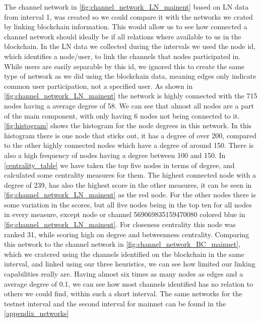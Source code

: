 The channel network in \cref{fig:channel_network_LN_mainent} based on LN data from interval 1, was created so we could compare it with the networks we crated by linking blockchain information. This would allow us to see how connected a channel network should ideally be if all relations where available to us in the blockchain. In the LN data we collected during the intervals we used the node id, which identifies a node/user, to link the channels that nodes participated in. While users are easily separable by this id, we ignored this to create the same type of network as we did using the blockchain data, meaning edges only indicate common user participation, not a specified user. 
As shown in \cref{fig:channel_network_LN_mainent} the network is highly connected with the 715 nodes having a average degree of 58. We can see that almost all nodes are a part of the main component, with only having 6 nodes not being connected to it.
\cref{fig:histogram} shows the histogram for the node degrees in this network. In this histogram there is one node that sticks out, it has a degree of over 200, compared to the other highly connected nodes which have a degree of around 150. There is also a high frequency of nodes having a degree between 100 and 150. In \cref{centrality_table} we have taken the top five nodes in terms of degree, and calculated some centrality measures for them. The highest connected node with a degree of 239, has also the highest score in the other measures, it can be seen in \cref{fig:channel_network_LN_mainent} as the red node. For the other nodes there is some variation in the scores, but all five nodes being in the top ten for all nodes in every measure, except node or channel 569069835159470080 colored blue in \cref{fig:channel_network_LN_mainent}. For closeness centrality this node was ranked 31, while scoring high on degree and betweenness centrality. 
Comparing this network to the channel network in \cref{fig:channel_network_BC_mainnet}, which we cratered using the channels identified on the blockchain in the same interval, and linked using our three heuristics, we can see how limited our linking capabilities really are.
Having almost six times as many nodes as edges and a average degree of 0.1, we can see how most channels identified has no relation to others we could find, within such a short interval.
The same networks for the testnet interval and the second interval for mainnet can be found in the \cref{appendix_networks}

